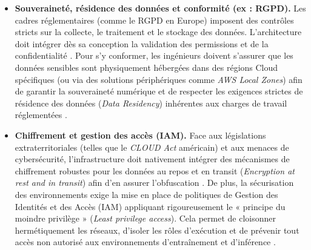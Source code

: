 \begin{itemize}
    \item[$\bullet$] \textbf{Souveraineté, résidence des données et conformité (ex : RGPD).} Les cadres réglementaires (comme le RGPD en Europe) imposent des contrôles stricts sur la collecte, le traitement et le stockage des données. L'architecture doit intégrer dès sa conception la validation des permissions et de la confidentialité \cite{43}. Pour s'y conformer, les ingénieurs doivent s'assurer que les données sensibles sont physiquement hébergées dans des régions Cloud spécifiques (ou via des solutions périphériques comme \textit{AWS Local Zones}) afin de garantir la souveraineté numérique et de respecter les exigences strictes de résidence des données (\textit{Data Residency}) inhérentes aux charges de travail réglementées \cite{43}.
    \item[$\bullet$] \textbf{Chiffrement et gestion des accès (IAM).} Face aux législations extraterritoriales (telles que le \textit{CLOUD Act} américain) et aux menaces de cybersécurité, l'infrastructure doit nativement intégrer des mécanismes de chiffrement robustes pour les données au repos et en transit (\textit{Encryption at rest and in transit}) afin d'en assurer l'obfuscation \cite{43}. De plus, la sécurisation des environnements exige la mise en place de politiques de Gestion des Identités et des Accès (IAM) appliquant rigoureusement le « principe du moindre privilège » (\textit{Least privilege access}). Cela permet de cloisonner hermétiquement les réseaux, d'isoler les rôles d'exécution et de prévenir tout accès non autorisé aux environnements d'entraînement et d'inférence \cite{17, 43}.
\end{itemize}






